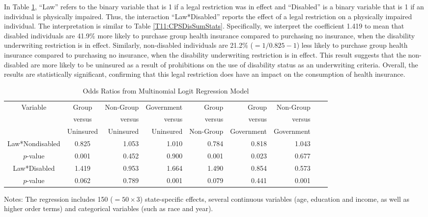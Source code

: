 In Table \ref{T11:CPSMultiLogit}, ``Law'' refers to the binary
variable that is 1 if a legal restriction was in effect and
``Disabled''  is a binary variable that is 1 if an
individual is physically impaired. Thus, the interaction
``Law*Disabled'' reports the effect of a legal restriction on a
physically impaired individual. The interpretation is similar to
Table \ref{T11:CPSDisSumStats}. Specifically, we interpret the
coefficient 1.419 to mean that disabled individuals are 41.9\% more
likely to purchase group health insurance compared to purchasing no
insurance, when the disability underwriting restriction is in
effect. Similarly, non-disabled individuals are 21.2\% ($=1/0.825 -
1$) less likely to purchase group health insurance compared to
purchasing no insurance, when the disability underwriting
restriction is in effect. This result suggests that the non-disabled
are more likely to be uninsured as a result of prohibitions on the
use of disability status as an underwriting criteria. Overall, the
results are statistically significant, confirming that this legal
restriction does have an impact on the consumption of health
insurance.


 \begin{table}[h]  \begin{center}
\caption{\label{T11:CPSMultiLogit} Odds Ratios from Multinomial
Logit Regression Model}
\begin{tabular}{ccrrrrrrr}
 \hline
Variable & Group & Non-Group & Government & Group & Group &
Non-Group \\
 & versus &  versus &  versus &  versus &  versus &  versus \\
 &Uninsured&Uninsured&Uninsured&Non-Group &Government& Government \\
 \hline
 Law*Nondisabled & 0.825 & 1.053 & 1.010 & 0.784 & 0.818 & 1.043 \\
  $p$-value & 0.001 & 0.452 & 0.900 & 0.001 & 0.023 & 0.677 \\
 Law*Disabled & 1.419 & 0.953 & 1.664 & 1.490 & 0.854 & 0.573 \\
  $p$-value & 0.062 & 0.789 & 0.001 & 0.079 & 0.441 & 0.001 \\
  \hline
\end{tabular}
Notes: The regression includes 150 ($=50 \times 3$) state-specific
effects, several continuous variables (age, education and income, as
well as higher order terms) and categorical variables (such as race
and year).
 \end{center}
\end{table}

